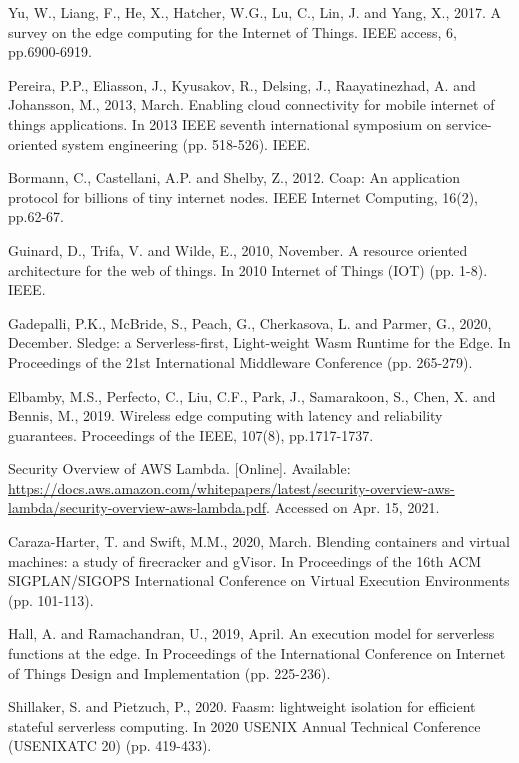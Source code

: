 \documentclass{ieeeaccess}
\begin{document}
\begin{thebibliography}{00}
 Yu, W., Liang, F., He, X., Hatcher, W.G., Lu, C., Lin, J. and Yang, X., 2017. A survey on the edge computing for the Internet of Things. IEEE access, 6, pp.6900-6919.

 Pereira, P.P., Eliasson, J., Kyusakov, R., Delsing, J., Raayatinezhad, A. and Johansson, M., 2013, March. Enabling cloud connectivity for mobile internet of things applications. In 2013 IEEE seventh international symposium on service-oriented system engineering (pp. 518-526). IEEE.

 Bormann, C., Castellani, A.P. and Shelby, Z., 2012. Coap: An application protocol for billions of tiny internet nodes. IEEE Internet Computing, 16(2), pp.62-67.

 Guinard, D., Trifa, V. and Wilde, E., 2010, November. A resource oriented architecture for the web of things. In 2010 Internet of Things (IOT) (pp. 1-8). IEEE.

 Gadepalli, P.K., McBride, S., Peach, G., Cherkasova, L. and Parmer, G., 2020, December. Sledge: a Serverless-first, Light-weight Wasm Runtime for the Edge. In Proceedings of the 21st International Middleware Conference (pp. 265-279).

 Elbamby, M.S., Perfecto, C., Liu, C.F., Park, J., Samarakoon, S., Chen, X. and Bennis, M., 2019. Wireless edge computing with latency and reliability guarantees. Proceedings of the IEEE, 107(8), pp.1717-1737.

 Security Overview of AWS Lambda. [Online]. Available: \url{https://docs.aws.amazon.com/whitepapers/latest/security-overview-aws-lambda/security-overview-aws-lambda.pdf}. Accessed on Apr. 15, 2021.

 Caraza-Harter, T. and Swift, M.M., 2020, March. Blending containers and virtual machines: a study of firecracker and gVisor. In Proceedings of the 16th ACM SIGPLAN/SIGOPS International Conference on Virtual Execution Environments (pp. 101-113).

 Hall, A. and Ramachandran, U., 2019, April. An execution model for serverless functions at the edge. In Proceedings of the International Conference on Internet of Things Design and Implementation (pp. 225-236).

 Shillaker, S. and Pietzuch, P., 2020. Faasm: lightweight isolation for efficient stateful serverless computing. In 2020 {USENIX} Annual Technical Conference ({USENIX}{ATC} 20) (pp. 419-433).


\end{thebibliography}
\end{document}
